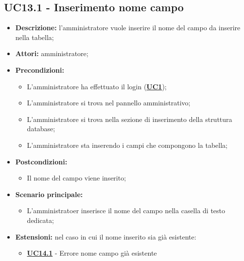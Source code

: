 \documentclass[5pt]{article}
\begin{document}
\subsection{UC13.1 - Inserimento nome campo}
\label{sec:UC13.1}
\begin{itemize}
	\item \textbf{Descrizione:} l’amministratore vuole inserire il nome del campo da inserire nella tabella;
	\item \textbf{Attori:} amministratore;
	\item \textbf{Precondizioni:} 
	\begin{itemize}
		\item L’amministratore ha effettuato il login (\hyperref[sec:UC1]{\textbf{UC1}});
		\item L’amministratore si trova nel pannello amministrativo;
		\item L’amministratore si trova nella sezione di inserimento della struttura database;
		\item L’amministratore sta inserendo i campi che compongono la tabella;
	\end{itemize}
	\item \textbf{Postcondizioni:} 
	\begin{itemize}
		\item Il nome del campo viene inserito;
	\end{itemize}
	\item \textbf{Scenario principale:} 
	\begin{itemize}
		\item L’amministratoer inserisce il nome del campo nella casella di testo dedicata;
	\end{itemize}
	\item \textbf{Estensioni:} nel caso in cui il nome inserito sia già esistente:
	\begin{itemize}
		\item \hyperref[sec:UC14.1]{\textbf{UC14.1}} - Errore nome campo già esistente
	\end{itemize}
\end{itemize}
\end{document}
